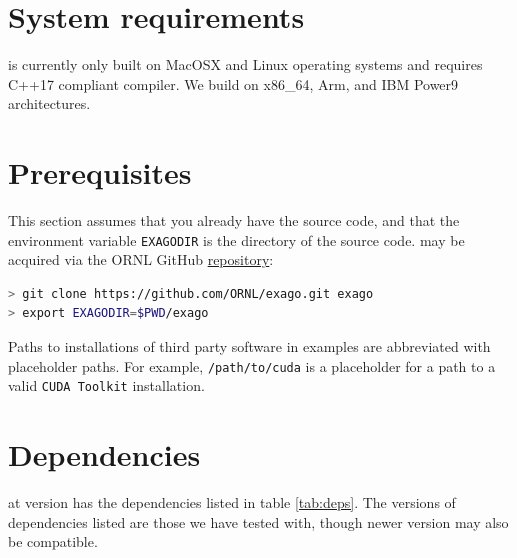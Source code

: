 \section{System requirements}

\exago is currently only built on MacOSX and Linux operating systems and requires C++17 compliant compiler.
We build \exago on x86\_64, Arm, and IBM Power9 architectures.

\section{Prerequisites}

This section assumes that you already have the \exago source code, and that the environment variable \texttt{EXAGODIR} is the directory of the \exago source code.
\exago may be acquired via the ORNL GitHub \href{https://github.com/ORNL/exago}{repository}:

\begin{lstlisting}[language=bash]
> git clone https://github.com/ORNL/exago.git exago
> export EXAGODIR=$PWD/exago
\end{lstlisting}

Paths to installations of third party software in examples are abbreviated with placeholder paths.
For example, \texttt{/path/to/cuda} is a placeholder for a path to a valid \texttt{CUDA Toolkit} installation.

\section{Dependencies}

\exago at version \exagoversion has the dependencies listed in table \ref{tab:deps}. The versions of dependencies listed are those we have tested with, though newer version may also be compatible.

